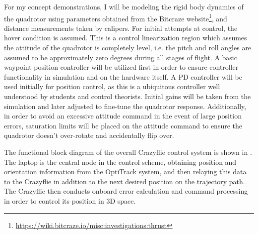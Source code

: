 \documentclass[onecolumn,10pt]{IEEEtran}
\begin{document}
For my concept demonstrations, I will be modeling the rigid body dynamics of the quadrotor using parameters obtained from the Bitcraze website\footnote{\url{https://wiki.bitcraze.io/misc:investigations:thrust}}, and distance measurements taken by calipers. For initial attempts at control, the hover condition is assumed. This is a control linearization region which assumes the attitude of the quadrotor is completely level, i.e. the pitch and roll angles are assumed to be approximately zero degrees during all stages of flight. A basic waypoint position controller will be utilized first in order to ensure controller functionality in simulation and on the hardware itself. A PD controller will be used initially for position control, as this is a ubiquitous controller well understood by students and control theorists. Initial gains will be taken from the simulation \cite{hartman2014quadcopter}
and later adjusted to fine-tune the quadrotor response. Additionally, in order to avoid an excessive attitude command in the event of large position errors, saturation limits will be placed on the attitude command to ensure the quadrotor doesn't over-rotate and accidentally flip over. 

The functional block diagram of the overall Crazyflie control system is shown in . The laptop is the central node in the control scheme, obtaining position and orientation information from the OptiTrack system, and then relaying this data to the Crazyflie in addition to the next desired position on the trajectory path. The Crazyflie then conducts onboard error calculation and command processing in order to control its position in 3D space.

\end{document}
